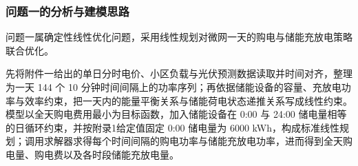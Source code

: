 
\subsubsection{问题一的分析与建模思路}

问题一属确定性线性优化问题，采用线性规划对微网一天的购电与储能充放电策略联合优化。

先将附件一给出的单日分时电价、小区负载与光伏预测数据读取并时间对齐，整理为一天 144 个 10 分钟时间间隔上的功率序列；再依据储能设备的容量、充放电功率与效率约束，把一天内的能量平衡关系与储能荷电状态递推关系写成线性约束。模型以全天购电费用最小为目标函数，加入储能设备在 0:00 与 24:00 储电量相等的日循环约束，并按附录1给定值固定 0:00 储电量为 6000 kWh，构成标准线性规划；调用求解器求得每个时间间隔的购电功率与储能充放电功率，进而得到全天购电量、购电费以及各时段储能充放电量。
